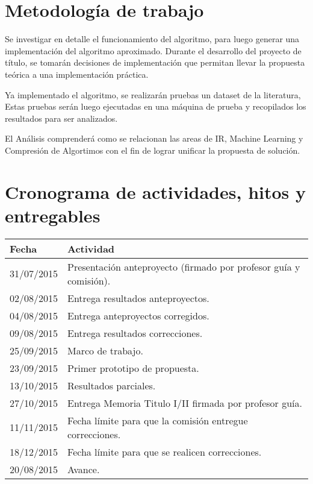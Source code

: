 \documentclass{udparticle}
\begin{document}
 
 
 

\section{Metodología de trabajo}


Se investigar en detalle el funcionamiento del algoritmo, para luego generar una
implementación del algoritmo aproximado.
Durante el desarrollo del proyecto de título, se tomarán
decisiones de implementación que permitan llevar la propuesta teórica a una implementación
práctica.

Ya implementado el algoritmo, se realizarán pruebas un dataset de la literatura,
Estas pruebas serán luego ejecutadas en una máquina de prueba y
recopilados los resultados para ser analizados.

El Análisis comprenderá como se relacionan las areas de IR, Machine Learning y Compresión de Algortimos
con el fin de lograr unificar la propuesta de solución. 


 




\section{Cronograma de actividades, hitos y entregables}
  \begin{tabular}{ll}
  \hline\noalign{\smallskip}
  Fecha & Actividad \\
  \hline\noalign{\smallskip}
  31/07/2015 & Presentación anteproyecto (firmado por profesor guía y comisión).\\

  02/08/2015 & Entrega resultados anteproyectos.\\

  04/08/2015 & Entrega anteproyectos corregidos.\\

  09/08/2015 &  Entrega resultados correcciones.\\

  25/09/2015 & Marco de trabajo.\\

  23/09/2015 & Primer prototipo de propuesta.\\

  13/10/2015 & Resultados parciales.\\

  27/10/2015 & Entrega Memoria Titulo I/II firmada por profesor guía.\\

  11/11/2015 & Fecha límite para que la comisión entregue correcciones.\\

  18/12/2015 & Fecha límite para que se realicen correcciones.\\

  20/08/2015 & Avance.\\

  \hline

  \end{tabular}
\end{document}
